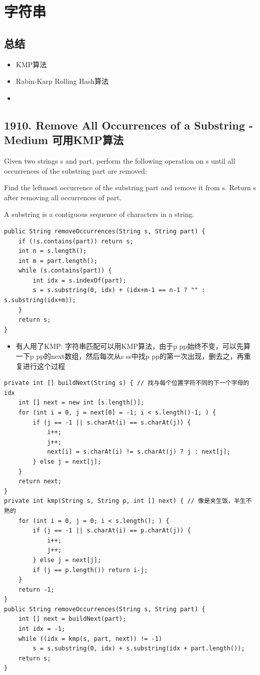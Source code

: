 \documentclass[9pt, b5paaper]{book}
\begin{document}
\chapter{字符串}
\label{sec-6}
\section{总结}
\label{sec-6-1}
\begin{itemize}
\item KMP算法
\item Rabin-Karp Rolling Hash算法
\item 
\end{itemize}

\section{1910. Remove All Occurrences of a Substring - Medium 可用KMP算法}
\label{sec-6-2}
Given two strings s and part, perform the following operation on s until all occurrences of the substring part are removed:

Find the leftmost occurrence of the substring part and remove it from s.
Return s after removing all occurrences of part.

A substring is a contiguous sequence of characters in a string.
\begin{verbatim}
public String removeOccurrences(String s, String part) {
    if (!s.contains(part)) return s;
    int n = s.length();
    int m = part.length();
    while (s.contains(part)) {
        int idx = s.indexOf(part);
        s = s.substring(0, idx) + (idx+m-1 == n-1 ? "" : s.substring(idx+m));
    }
    return s;
}
\end{verbatim}
\begin{itemize}
\item 有人用了KMP: 字符串匹配可以用KMP算法，由于p pp始终不变，可以先算一下p pp的next数组，然后每次从s ss中找p pp的第一次出现，删去之，再重复进行这个过程
\end{itemize}
\begin{verbatim}
private int [] buildNext(String s) { // 找与每个位置字符不同的下一个字母的idx
    int [] next = new int [s.length()];
    for (int i = 0, j = next[0] = -1; i < s.length()-1; ) {
        if (j == -1 || s.charAt(i) == s.charAt(j)) {
            i++;
            j++;
            next[i] = s.charAt(i) != s.charAt(j) ? j : next[j];
        } else j = next[j];
    }
    return next;
}
private int kmp(String s, String p, int [] next) { // 像是夹生饭，半生不熟的
    for (int i = 0, j = 0; i < s.length(); ) {
        if (j == -1 || s.charAt(i) == p.charAt(j)) {
            i++;
            j++;
        } else j = next[j];
        if (j == p.length()) return i-j;
    }
    return -1;
}
public String removeOccurrences(String s, String part) {
    int [] next = buildNext(part);
    int idx = -1;
    while ((idx = kmp(s, part, next)) != -1) 
        s = s.substring(0, idx) + s.substring(idx + part.length());
    return s;
}
\end{verbatim}
\end{document}
